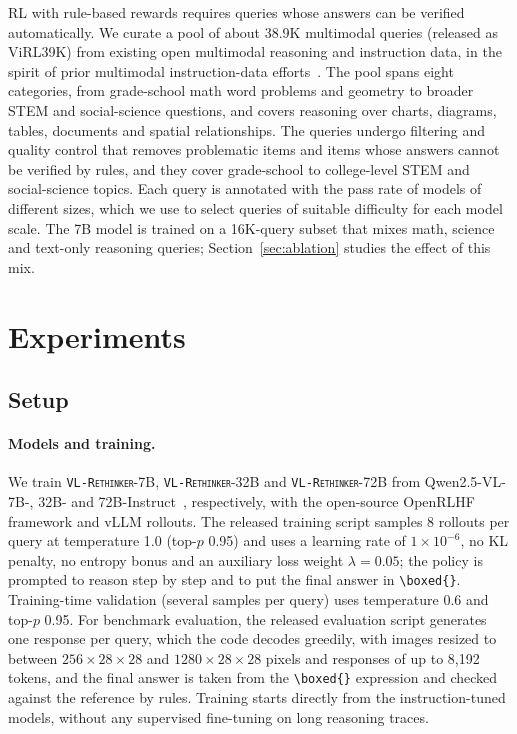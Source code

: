 \documentclass{article}
\newcommand{\model}{\texttt{\textsc{VL-Rethinker}}\xspace}
\begin{document}
RL with rule-based rewards requires queries whose answers can be verified automatically. We curate a pool of about 38.9K multimodal queries (released as ViRL39K) from existing open multimodal reasoning and instruction data, in the spirit of prior multimodal instruction-data efforts~\cite{mammothvl,visualwebinstruct}. The pool spans eight categories, from grade-school math word problems and geometry to broader STEM and social-science questions, and covers reasoning over charts, diagrams, tables, documents and spatial relationships. The queries undergo filtering and quality control that removes problematic items and items whose answers cannot be verified by rules, and they cover grade-school to college-level STEM and social-science topics. Each query is annotated with the pass rate of models of different sizes, which we use to select queries of suitable difficulty for each model scale. The 7B model is trained on a 16K-query subset that mixes math, science and text-only reasoning queries; Section~\ref{sec:ablation} studies the effect of this mix.

\section{Experiments}
\label{sec:exp}

\subsection{Setup}
\label{sec:setup}

\paragraph{Models and training.} We train \model-7B, \model-32B and \model-72B from Qwen2.5-VL-7B-, 32B- and 72B-Instruct~\cite{qwen2_5_vl}, respectively, with the open-source OpenRLHF framework and vLLM rollouts. The released training script samples 8 rollouts per query at temperature 1.0 (top-$p$ 0.95) and uses a learning rate of $1\times10^{-6}$, no KL penalty, no entropy bonus and an auxiliary loss weight $\lambda=0.05$; the policy is prompted to reason step by step and to put the final answer in \texttt{\textbackslash boxed\{\}}. Training-time validation (several samples per query) uses temperature 0.6 and top-$p$ 0.95. For benchmark evaluation, the released evaluation script generates one response per query, which the code decodes greedily, with images resized to between $256\times28\times28$ and $1280\times28\times28$ pixels and responses of up to 8{,}192 tokens, and the final answer is taken from the \texttt{\textbackslash boxed\{\}} expression and checked against the reference by rules. Training starts directly from the instruction-tuned models, without any supervised fine-tuning on long reasoning traces.
\end{document}

